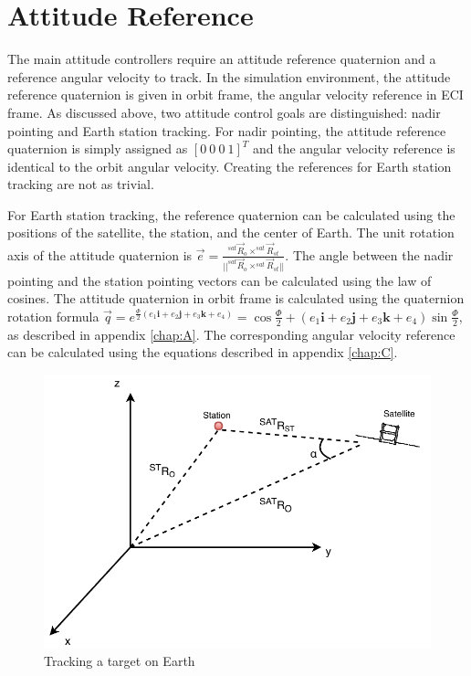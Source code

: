 \section{Attitude Reference}

The main attitude controllers require an attitude reference quaternion and a reference angular velocity to track. In the simulation environment, the attitude reference quaternion is given in orbit frame, the angular velocity reference in ECI frame. As discussed above, two attitude control goals are distinguished: nadir pointing and Earth station tracking. For nadir pointing, the attitude reference quaternion is simply assigned as $[0 \ 0 \ 0 \ 1]^T$ and the angular velocity reference is identical to the orbit angular velocity. Creating the references for Earth station tracking are not as trivial.

For Earth station tracking, the reference quaternion can be calculated using the positions of the satellite, the station, and the center of Earth. The unit rotation axis of the attitude quaternion is $\vec{e} = \frac{^{sat}\vec{R}_{o} \times ^{sat}\vec{R}_{st}}{||^{sat}\vec{R}_{o} \times ^{sat}\vec{R}_{st}||}$. The angle between the nadir pointing and the station pointing vectors can be calculated using the law of cosines. The attitude quaternion in orbit frame is calculated using the quaternion rotation formula $ \vec q = e^{\frac{\Phi}{2} (e_1 \textbf{i}+ e_2 \textbf{j} + e_3 \textbf{k} + e_4)} = \cos \frac{\Phi}{2} + (e_1 \textbf{i}+ e_2 \textbf{j} + e_3 \textbf{k} +e_4) \sin \frac{\Phi}{2}$, as described in appendix \ref{chap:A}. The corresponding angular velocity reference can be calculated using the equations described in appendix \ref{chap:C}.



%
%
%

\begin{figure}[H]
	\centering
	\includegraphics[width=0.7\linewidth]{figures/ST}
	\caption{Tracking a target on Earth }
	\label{fig:TS}
\end{figure}
